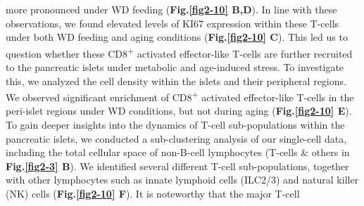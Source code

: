 more pronounced under WD feeding (\textbf{Fig.\ref{fig2-10} B,D}). In line with these observations, we found elevated levels of KI67 expression within these T-cells under both WD feeding and aging conditions (\textbf{Fig.\ref{fig2-10} C}). This led us to question whether these CD8\textsuperscript{+} activated effector-like T-cells are further recruited to the pancreatic islets under metabolic and age-induced stress. To investigate this, we analyzed the cell density within the islets and their peripheral regions. We observed significant enrichment of CD8\textsuperscript{+} activated effector-like T-cells in the peri-islet regions under WD conditions, but not during aging (\textbf{Fig.\ref{fig2-10} E}).\\

To gain deeper insights into the dynamics of T-cell sub-populations within the pancreatic islets, we conducted a sub-clustering analysis of our single-cell data, including the total cellular space of non-B-cell lymphocytes (T-cells \& others in \textbf{Fig.\ref{fig2-3} B}). We identified several different T-cell sub-populations, together with other lymphocytes such as innate lymphoid cells (ILC2/3) and natural killer (NK) cells (\textbf{Fig.\ref{fig2-10} F}). It is noteworthy that the major T-cell 

